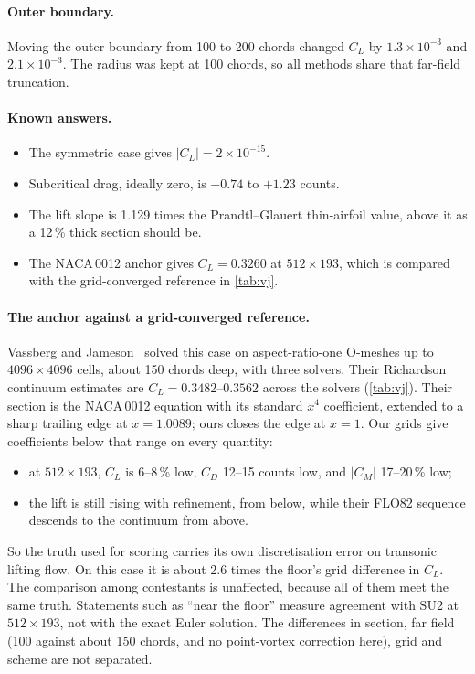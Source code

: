 \documentclass[11pt]{article}
\newcommand{\CL}{C_L}
\newcommand{\CD}{C_D}
\newcommand{\CM}{C_M}
\begin{document}
\paragraph{Outer boundary.}
Moving the outer boundary from 100 to 200 chords changed $\CL$ by $1.3\times10^{-3}$ and
$2.1\times10^{-3}$. The radius was kept at 100 chords, so all methods share that far-field
truncation.

\paragraph{Known answers.}
\begin{itemize}
  \item The symmetric case gives $|\CL| = 2\times10^{-15}$.
  \item Subcritical drag, ideally zero, is $-0.74$ to $+1.23$ counts.
  \item The lift slope is 1.129 times the Prandtl--Glauert thin-airfoil value, above it as a 12\,\%
    thick section should be.
  \item The NACA\,0012 anchor gives $\CL = 0.3260$ at $512\times193$, which is compared with the
    grid-converged reference in \cref{tab:vj}.
\end{itemize}

\paragraph{The anchor against a grid-converged reference.}
Vassberg and Jameson~\cite{vassberg2010} solved this case on aspect-ratio-one O-meshes up to
$4096\times4096$ cells, about 150 chords deep, with three solvers. Their Richardson continuum
estimates are $\CL = 0.3482$--$0.3562$ across the solvers (\cref{tab:vj}). Their section is the
NACA\,0012 equation with its standard $x^4$ coefficient, extended to a sharp trailing edge at
$x = 1.0089$; ours closes the edge at $x = 1$. Our grids give coefficients below that range on every
quantity:
\begin{itemize}
  \item at $512\times193$, $\CL$ is 6--8\,\% low, $\CD$ 12--15 counts low, and $|\CM|$
    17--20\,\% low;
  \item the lift is still rising with refinement, from below, while their FLO82 sequence descends
    to the continuum from above.
\end{itemize}
So the truth used for scoring carries its own discretisation error on transonic lifting flow. On
this case it is about 2.6 times the floor's grid difference in $\CL$. The comparison among
contestants is unaffected, because all of them meet the same truth. Statements such as ``near the
floor'' measure agreement with SU2 at $512\times193$, not with the exact Euler solution. The
differences in section, far field (100 against about 150 chords, and no point-vortex correction
here), grid and scheme are not separated.
\end{document}
